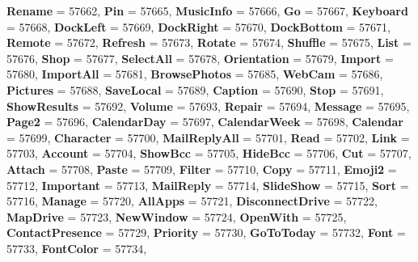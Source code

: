 \begin{DoxyCompactItemize}
\newline
{\bfseries Rename} = 57662, 
{\bfseries Pin} = 57665, 
{\bfseries Music\+Info} = 57666, 
{\bfseries Go} = 57667, 
\newline
{\bfseries Keyboard} = 57668, 
{\bfseries Dock\+Left} = 57669, 
{\bfseries Dock\+Right} = 57670, 
{\bfseries Dock\+Bottom} = 57671, 
\newline
{\bfseries Remote} = 57672, 
{\bfseries Refresh} = 57673, 
{\bfseries Rotate} = 57674, 
{\bfseries Shuffle} = 57675, 
\newline
{\bfseries List} = 57676, 
{\bfseries Shop} = 57677, 
{\bfseries Select\+All} = 57678, 
{\bfseries Orientation} = 57679, 
\newline
{\bfseries Import} = 57680, 
{\bfseries Import\+All} = 57681, 
{\bfseries Browse\+Photos} = 57685, 
{\bfseries Web\+Cam} = 57686, 
\newline
{\bfseries Pictures} = 57688, 
{\bfseries Save\+Local} = 57689, 
{\bfseries Caption} = 57690, 
{\bfseries Stop} = 57691, 
\newline
{\bfseries Show\+Results} = 57692, 
{\bfseries Volume} = 57693, 
{\bfseries Repair} = 57694, 
{\bfseries Message} = 57695, 
\newline
{\bfseries Page2} = 57696, 
{\bfseries Calendar\+Day} = 57697, 
{\bfseries Calendar\+Week} = 57698, 
{\bfseries Calendar} = 57699, 
\newline
{\bfseries Character} = 57700, 
{\bfseries Mail\+Reply\+All} = 57701, 
{\bfseries Read} = 57702, 
{\bfseries Link} = 57703, 
\newline
{\bfseries Account} = 57704, 
{\bfseries Show\+Bcc} = 57705, 
{\bfseries Hide\+Bcc} = 57706, 
{\bfseries Cut} = 57707, 
\newline
{\bfseries Attach} = 57708, 
{\bfseries Paste} = 57709, 
{\bfseries Filter} = 57710, 
{\bfseries Copy} = 57711, 
\newline
{\bfseries Emoji2} = 57712, 
{\bfseries Important} = 57713, 
{\bfseries Mail\+Reply} = 57714, 
{\bfseries Slide\+Show} = 57715, 
\newline
{\bfseries Sort} = 57716, 
{\bfseries Manage} = 57720, 
{\bfseries All\+Apps} = 57721, 
{\bfseries Disconnect\+Drive} = 57722, 
\newline
{\bfseries Map\+Drive} = 57723, 
{\bfseries New\+Window} = 57724, 
{\bfseries Open\+With} = 57725, 
{\bfseries Contact\+Presence} = 57729, 
\newline
{\bfseries Priority} = 57730, 
{\bfseries Go\+To\+Today} = 57732, 
{\bfseries Font} = 57733, 
{\bfseries Font\+Color} = 57734, 

\end{DoxyCompactItemize}
